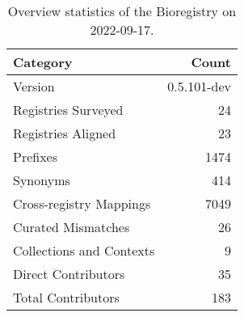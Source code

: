 \begin{table}
\centering
\caption{Overview statistics of the Bioregistry on 2022-09-17.}
\label{tab:bioregistry-summary}
\begin{tabular}{lr}
\toprule
                Category &       Count \\
\midrule
                 Version & 0.5.101-dev \\
     Registries Surveyed &          24 \\
      Registries Aligned &          23 \\
                Prefixes &        1474 \\
                Synonyms &         414 \\
 Cross-registry Mappings &        7049 \\
      Curated Mismatches &          26 \\
Collections and Contexts &           9 \\
     Direct Contributors &          35 \\
      Total Contributors &         183 \\
\bottomrule
\end{tabular}
\end{table}
